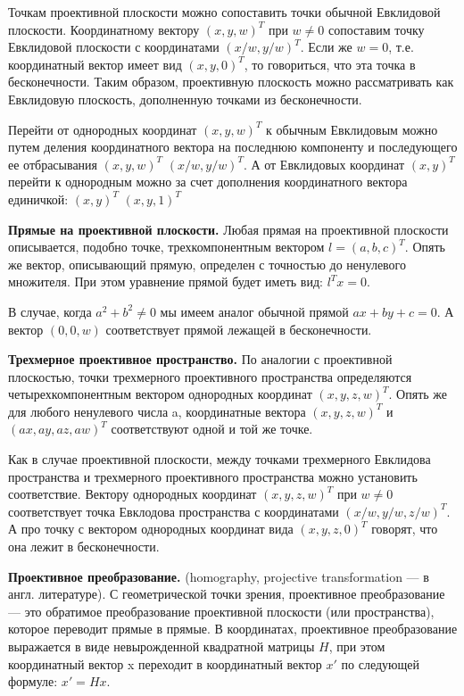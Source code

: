 Точкам проективной плоскости можно сопоставить точки обычной Евклидовой плоскости. Координатному вектору $(x,y,w)^T$ при $w \neq 0$ сопоставим точку Евклидовой плоскости с координатами $(x/w, y/w)^T$. Если же $w = 0$, т.е. координатный вектор имеет вид $(x, y, 0)^T$, то говориться, что эта точка в бесконечности. Таким образом, проективную плоскость можно рассматривать как Евклидовую плоскость, дополненную точками из бесконечности.

Перейти от однородных координат $(x, y, w)^T$ к обычным Евклидовым можно путем деления координатного вектора на последнюю компоненту и последующего ее отбрасывания $(x,y,w)^T$ $(x/w,y/w)^T$. А от Евклидовых координат $(x,y)^T$ перейти к однородным можно за счет дополнения координатного вектора единичкой: $(x,y)^T$ $(x,y,1)^T$

\textbf{Прямые на проективной плоскости.} Любая прямая на проективной плоскости описывается, подобно точке, трехкомпонентным вектором $l = (a,b,c)^T$. Опять же вектор, описывающий прямую, определен с точностью до ненулевого множителя. При этом уравнение прямой будет иметь вид: $l^T x = 0$.

В случае, когда $a^2 + b^2 \neq 0$ мы имеем аналог обычной прямой $ax + by + c = 0$. А вектор $(0,0,w)$ соответствует прямой лежащей в бесконечности.

\textbf{Трехмерное проективное пространство.} По аналогии с проективной плоскостью, точки трехмерного проективного пространства определяются четырехкомпонентным вектором однородных координат $(x,y,z,w)^T$. Опять же для любого ненулевого числа a, координатные вектора $(x,y,z,w)^T$ и $(ax,ay,az,aw)^T$ соответствуют одной и той же точке.

Как в случае проективной плоскости, между точками трехмерного Евклидова пространства и трехмерного проективного пространства можно установить соответствие. Вектору однородных координат $(x,y,z,w)^T$ при $w \neq 0$ соответствует точка Евклодова пространства с координатами $(x/w,y/w,z/w)^T$. А про точку с вектором однородных координат вида $(x,y,z,0)^T$ говорят, что она лежит в бесконечности.

\textbf{Проективное преобразование.} (homography, projective transformation — в англ. литературе). С геометрической точки зрения, проективное преобразование — это обратимое преобразование проективной плоскости (или пространства), которое переводит прямые в прямые. В координатах, проективное преобразование выражается в виде невырожденной квадратной матрицы $H$, при этом координатный вектор x переходит в координатный вектор $x'$ по следующей формуле: $x' = H x$.

